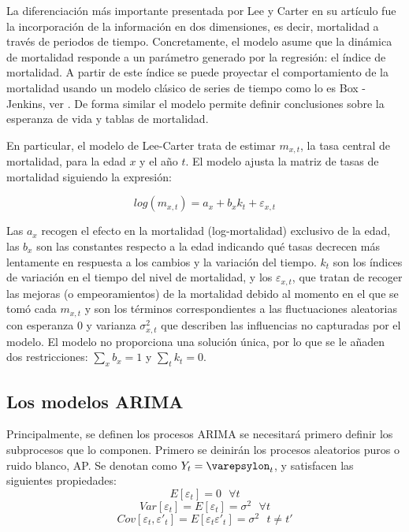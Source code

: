 \documentclass{article}
\begin{document}
La diferenciación más importante presentada por Lee y Carter en su artículo fue la incorporación  de  la  información  en  dos  dimensiones,  es  decir,  mortalidad  a  través  de  periodos de tiempo. Concretamente, el modelo asume que la dinámica de mortalidad responde a un parámetro generado por la regresión: el índice de mortalidad. A partir de este índice se puede proyectar el comportamiento de la mortalidad usando un modelo clásico de series de tiempo como lo es Box - Jenkins, ver  \cite{lee1992modeling}. De forma similar el modelo permite definir conclusiones sobre la esperanza de vida y tablas de mortalidad.

\vspace{0.5cm}

En particular, el modelo de Lee-Carter trata de estimar $m_{x,t}$, la tasa central de mortalidad, para la edad $x$ y el año $t$. El modelo ajusta la matriz de tasas de mortalidad siguiendo la expresión:

\begin{equation}
\label{leecarter}
log(m_{x,t})=a_{x}+b_{x}k_{t}+\varepsilon_{x,t}
\end{equation}

Las $a_{x}$ recogen el efecto en la mortalidad (log-mortalidad) exclusivo de la edad, las $b_{x}$ son las constantes respecto a la edad indicando qué tasas decrecen más lentamente en respuesta a los cambios y la variación del tiempo. $k_{t}$ son los índices de variación en el tiempo del nivel de mortalidad, y los $\varepsilon_{x,t}$, que tratan de recoger las mejoras (o empeoramientos) de la mortalidad debido al momento en el que se tomó cada $m_{x,t}$ y son los términos correspondientes a las fluctuaciones aleatorias con esperanza 0 y varianza $\sigma^{2}_{x,t}$ que describen las influencias no capturadas por el modelo. El modelo no proporciona una solución única, por lo que se le añaden dos restricciones: $\sum_{x}b_{x}=1$
 y $\sum_{t}k_{t}=0$.

\subsection{Los modelos ARIMA}

Principalmente, se definen los procesos ARIMA se necesitará primero definir los subprocesos que lo componen. Primero se deinirán los procesos aleatorios puros o ruido blanco, AP. Se denotan como $Y_{t}=\varepsylon_{t}$, y satisfacen las siguientes propiedades:
$$
E[\varepsilon_{t}]=0\,\,\,\, \forall t
$$
$$
Var[\varepsilon_{t}]=E[\varepsilon_{t}]=\sigma^{2} \,\,\,\, \forall t
$$
$$
Cov[\varepsilon_{t},\varepsilon'_{t}]=E[\varepsilon_{t}\varepsilon'_{t}]=\sigma^{2} \,\,\,\, t\neq t'
$$
\end{document}
